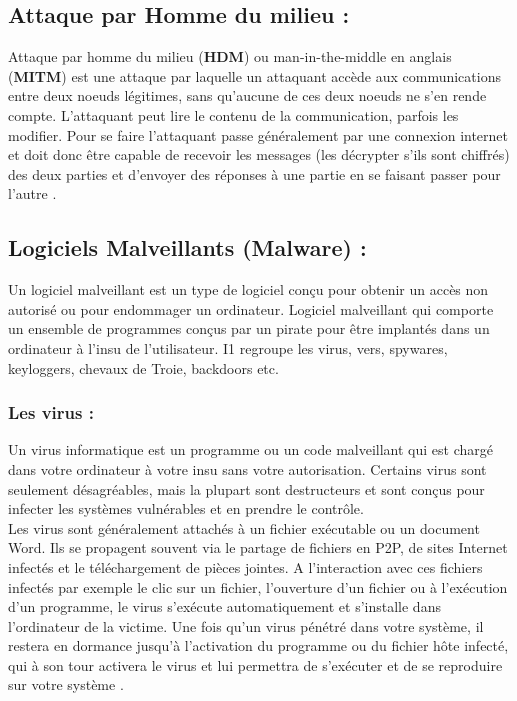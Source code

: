 \subsection{Attaque par Homme du milieu :}
Attaque par homme du milieu (\textbf{HDM}) ou man-in-the-middle en anglais (\textbf{MITM}) est une attaque par laquelle un attaquant accède aux communications entre deux noeuds légitimes, sans qu’aucune de ces deux noeuds ne s’en rende compte. L’attaquant peut lire le contenu de la communication, parfois les modifier.
Pour se faire l’attaquant passe généralement par une connexion internet et doit donc être capable de recevoir les messages (les décrypter s’ils sont chiffrés) des deux parties et d'envoyer des réponses à une partie en se faisant passer pour l'autre \cite{ref14}.

\subsection{Logiciels Malveillants (Malware) :}
Un logiciel malveillant est un type de logiciel conçu pour obtenir un accès non autorisé ou pour endommager un ordinateur. Logiciel malveillant qui comporte un ensemble de programmes conçus par un pirate pour être implantés dans un ordinateur à l’insu de l’utilisateur. I1 regroupe les virus, vers, spywares, keyloggers, chevaux de Troie, backdoors etc.
\subsubsection{Les virus : }
Un virus informatique est un programme ou un code malveillant qui est chargé dans votre ordinateur à votre insu sans votre autorisation. Certains virus sont seulement désagréables, mais la plupart sont destructeurs et sont conçus pour infecter les systèmes vulnérables et en prendre le contrôle.\\

Les virus sont généralement attachés à un fichier exécutable ou un document Word. Ils se propagent souvent via le partage de fichiers en P2P, de sites Internet infectés et le téléchargement
de pièces jointes. A l’interaction avec ces fichiers infectés par exemple le clic sur un fichier, l’ouverture d’un fichier ou à l’exécution d’un programme, le virus s’exécute automatiquement et s’installe dans l’ordinateur de la victime. Une fois qu’un virus pénétré dans votre système, il restera en dormance jusqu’à l’activation du programme ou du fichier hôte infecté, qui à son tour activera le virus et lui permettra de s’exécuter et de se reproduire sur votre système \cite{ref13}.
